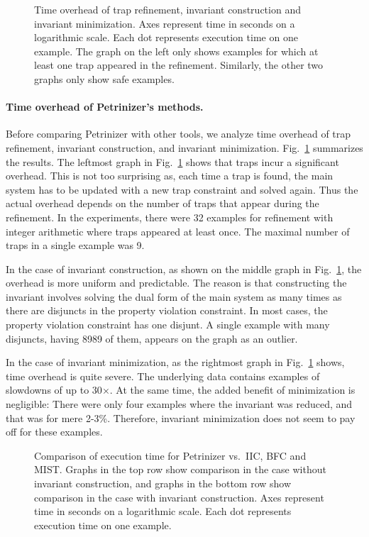\begin{figure}[t]
  \centering
  
  \caption{Time overhead of trap refinement, invariant
  construction and invariant minimization. Axes represent time in seconds on a
  logarithmic scale. Each dot represents
  execution time on one example. The graph on the left
  only shows examples for which at least one trap appeared in the refinement.
  Similarly, the other two graphs only show safe examples.}
  \label{fig:performance-various}
\end{figure}

\paragraph{Time overhead of Petrinizer's methods.} Before comparing Petrinizer
with other tools, we analyze time overhead of trap refinement, invariant construction, and invariant minimization.
Fig.~\ref{fig:performance-various} summarizes the results.
The leftmost graph in Fig.~\ref{fig:performance-various} shows that traps
incur a significant overhead. This is not too surprising as, each time
a trap is found, the main system has to be updated with a new trap
constraint and solved again. Thus the actual overhead depends on the number
of traps that appear during the refinement. In the experiments, there
were 32 examples for refinement with integer arithmetic where traps
appeared at least once. The maximal number of traps in a single example was 9.

In the case of invariant construction, as shown on the middle graph in
Fig.~\ref{fig:performance-various}, the overhead is more
uniform and predictable. The reason is that constructing the invariant
involves solving the dual form of the main system as many times as
there are disjuncts in the property violation constraint. In most
cases, the property violation constraint has one disjunt. A single example
with many disjuncts, having 8989 of them, appears on the graph
as an outlier.

In the case of invariant minimization, as the rightmost
graph in Fig.~\ref{fig:performance-various} shows, time overhead is
quite severe.
The underlying data contains examples of slowdowns of up to 30$\times$.
At the same time, the added benefit of minimization is negligible: There were only four examples where the invariant
was reduced, and that was for mere 2-3\%. 
Therefore, invariant minimization does not seem to pay off for these examples.

\begin{figure}[t]
  \centering 
  \caption{Comparison of execution time for Petrinizer vs.~IIC,
  BFC and MIST. Graphs in the top row show comparison in the case without
  invariant construction, and graphs in the bottom row show comparison in
  the case with invariant construction. Axes represent time in seconds on a
  logarithmic scale. Each dot represents execution time on one example.}
  \label{fig:performance-vs-tools}
\end{figure}

